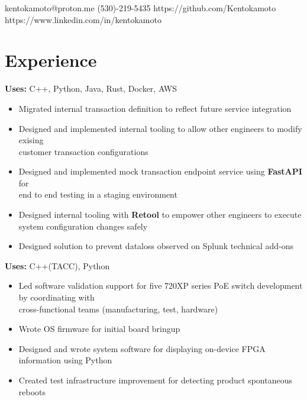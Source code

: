 \documentclass{Custom_CV}
\begin{document}
{kentokamoto@proton.me}
{}
{}
{(530)-219-5435}
{https://github.com/Kentokamoto}
{https://www.linkedin.com/in/kentokamoto}

\hfill %
\section{Experience}
\textbf{Uses:} C++, Python, Java, Rust, Docker, AWS
\begin{itemize}[noitemsep]
    \item Migrated internal transaction definition to reflect future service integration
    \item Designed and implemented internal tooling to allow other engineers to modify exising\\ customer transaction configurations
    \item Designed and implemented mock transaction endpoint service using \textbf{FastAPI} for\\ end to end testing in a staging environment
    \item Designed internal tooling with \textbf{Retool} to empower other engineers to execute\\ system configuration changes safely
\end{itemize}


\begin{itemize}[noitemsep]
    \item Designed solution to prevent dataloss observed on Splunk technical add-ons
\end{itemize}


\textbf{Uses:} C++(TACC), Python
\begin{itemize}[noitemsep]
    \item Led software validation support for five 720XP series PoE switch development by coordinating with\\ cross-functional teams (manufacturing, test, hardware)
    \item Wrote OS firmware for initial board bringup
    \item Designed and wrote system software for displaying on-device FPGA information using Python
    \item Created test infrastructure improvement for detecting product spontaneous reboots
\end{itemize}
\end{document}
